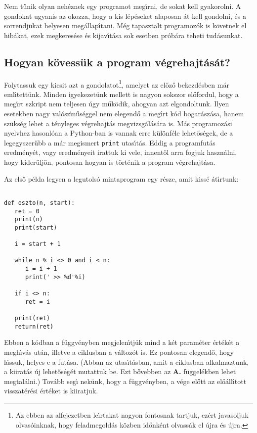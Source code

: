 \documentclass[12pt]{article}
\newcounter{minta}[section]
\newcounter{megold}
\begin{document}
Nem t\H{u}nik olyan neh\'eznek egy programot meg\'{\i}rni, de sokat kell gyakorolni. A gondokat ugyanis az okozza, 
hogy a kis l\'ep\'eseket alaposan \'at kell gondolni, \'es a sorrendj\"ukat helyesen meg\'allap\'{\i}tani. M\'eg 
tapasztalt programoz\'ok is k\"ovetnek el hib\'akat, ezek megkeres\'ese \'es kijav\'{\i}t\'asa sok esetben 
pr\'ob\'ara teheti tud\'asunkat.

\subsection{Hogyan k\"ovess\"uk a program v\'egrehajt\'as\'at?}


Folytassuk egy kicsit azt a gondolatot\footnote{Az ebben az alfejezetben le\'{\i}rtakat nagyon fontosnak tartjuk, 
ez\'ert javasoljuk olvas\'oinknak, hogy feladmegold\'as k\"ozben id\H{o}nk\'ent olvass\'ak el \'ujra \'es \'ujra.}, 
amelyet az el\H{o}z\H{o} bekezd\'esben m\'ar eml\'{\i}tett\"unk. Minden igyekezet\"unk mellett is nagyon sokszor 
el\H{o}fordul, hogy a meg\'{\i}rt szkript nem teljesen \'ugy m\H{u}k\"odik, ahogyan azt elgondoltunk. Ilyen 
esetekben nagy val\'osz\'{\i}\-n\H{u}s\'eg\-gel nem elegend\H{o} a meg\'{\i}rt k\'od bogar\'asz\'asa, hanem sz\"uks\'eg 
lehet a t\'enyleges v\'egrehajt\'as megvizsg\'al\'as\'ara is. M\'as programoz\'asi nyelvhez hasonl\'oan a Python-ban 
is vannak erre k\"ul\"onf\'ele lehet\H{o}s\'egek, de a legegyszer\H{u}bb a m\'ar megismert {\tt print} utas\'{\i}t\'as.
Eddig a programfut\'as eredm\'eny\'et, vagy eredm\'enyeit irattuk ki vele, innent\H{o}l arra fogjuk haszn\'alni, hogy 
kider\"ulj\"on, pontosan hogyan is t\"ort\'enik a program v\'egrehajt\'asa.

Az els\H{o} p\'elda legyen a legutols\'o mintaprogram egy r\'esze, amit kiss\'e \'at\'{\i}rtunk:

\begin{Verbatim}[fontsize=\small]

def oszto(n, start):
   ret = 0
   print(n)
   print(start)

   i = start + 1

   while n % i <> 0 and i < n:
      i = i + 1
      print(' >> %d'%i)

   if i <> n:
      ret = i

   print(ret)
   return(ret)

\end{Verbatim}

Ebben a k\'odban a f\"uggv\'enyben megjelen\'{\i}tj\"uk mind a k\'et param\'eter \'ert\'ek\'et a megh\'{\i}v\'as 
ut\'an, illetve a ciklusban a v\'altoz\'ot is. Ez pontosan elegend\H{o}, hogy l\'assuk, helyes-e a fut\'asa. 
(Abban az utas\'{\i}t\'asban, amit a ciklusban alkalmaztunk, a kiirat\'as \'uj lehet\H{o}s\'eg\'et mutattuk be. 
Ezt b\H{o}vebben az {\bf A.} f\"uggel\'ekben lehet megtal\'alni.) Tov\'abb seg\'{\i} nek\"unk, hogy a f\"uggv\'enyben,  
a v\'ege el\H{o}tt az el\H{o}\'all\'{\i}tott visszat\'er\'esi \'ert\'eket is kiiratjuk.
\end{document}
